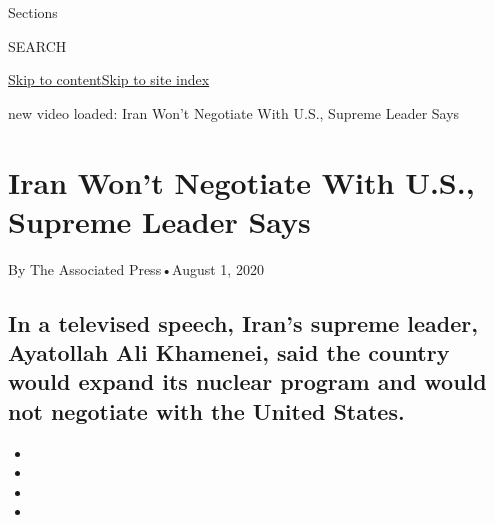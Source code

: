 Sections

SEARCH

\protect\hyperlink{site-content}{Skip to
content}\protect\hyperlink{site-index}{Skip to site index}

new video loaded: Iran Won't Negotiate With U.S., Supreme Leader Says

\hypertarget{iran-wont-negotiate-with-us-supreme-leader-says}{%
\section{Iran Won't Negotiate With U.S., Supreme Leader
Says}\label{iran-wont-negotiate-with-us-supreme-leader-says}}

By The Associated Press•August 1, 2020

\hypertarget{in-a-televised-speech-irans-supreme-leader-ayatollah-ali-khamenei-said-the-country-would-expand-its-nuclear-program-and-would-not-negotiate-with-the-united-states}{%
\subsection{In a televised speech, Iran's supreme leader, Ayatollah Ali
Khamenei, said the country would expand its nuclear program and would
not negotiate with the United
States.}\label{in-a-televised-speech-irans-supreme-leader-ayatollah-ali-khamenei-said-the-country-would-expand-its-nuclear-program-and-would-not-negotiate-with-the-united-states}}

\begin{itemize}
\item
\item
\item
\item
\end{itemize}


